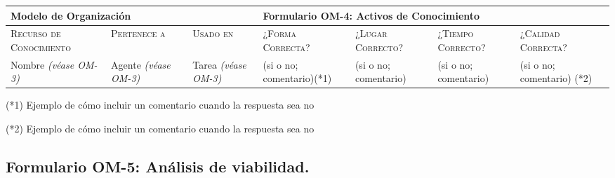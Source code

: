 \documentclass[12pt,a4paper,twoside,spanish]{article}      %
\begin{document}
\begin{table}[H]
\scriptsize
\begin{tabularx}{\textwidth}{|p{1.3cm}|p{1.3cm}|p{1.3cm}|X|X|X|X|} \hline
\multicolumn{3}{|l}{\textbf{Modelo de Organización}} & \multicolumn{4}{|l|}{\textbf{Formulario OM-4: Activos de Conocimiento}} \\ \hline\hline
\textsc{Recurso de Conocimiento} & \textsc{Pertenece a} &  \textsc{Usado en} &  \textsc{¿Forma
Correcta?} & \textsc{¿Lugar Correcto?} & \textsc{¿Tiempo Correcto?} & \textsc{¿Calidad Correcta?}\\ \hline
Nombre \emph{(\textit{véase} OM-3)} & Agente \emph{(\textit{véase} OM-3)}& Tarea \emph{(\textit{véase} OM-3)}& (si o no; comentario)(*1)&
(si o no; comentario)& (si o no; comentario) & (si o no; comentario) (*2)\\ \hline
\end{tabularx}

  \label{tab.OM4}
\end{table}

\noindent (*1) Ejemplo de cómo incluir un comentario cuando la respuesta sea no

\noindent (*2) Ejemplo de cómo incluir un comentario cuando la respuesta sea no

\pagebreak
\subsection{Formulario OM-5: Análisis de viabilidad.}
\end{document}
